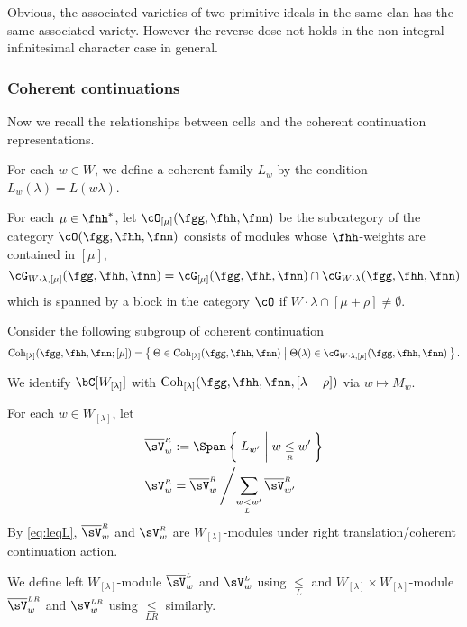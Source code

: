 \documentclass[12pt,a4paper]{amsart}
\numberwithin{equation}{section}
\theoremstyle{remark}
\def\bVL{{\overline{\sV}}^{\scriptscriptstyle L}}
\def\bVR{{\overline{\sV}}^{\scriptscriptstyle R}}
\def\bVLR{{\overline{\sV}}^{\scriptscriptstyle LR}}
\def\VL{{\sV}^{\scriptscriptstyle L}}
\def\VR{{\sV}^{\scriptscriptstyle R}}
\def\VLR{{\sV}^{\scriptscriptstyle LR}}
\def\Coh{\mathrm{Coh}}
\def\lneqL{\mathrel{\mathop{<}\limits_{\scriptscriptstyle L}}}
\def\leqL{\mathrel{\mathop{\leq}\limits_{\scriptscriptstyle L}}}
\def\leqR{\mathrel{\mathop{\leq}\limits_{\scriptscriptstyle R}}}
\def\leqLR{\mathrel{\mathop{\leq}\limits_{\scriptscriptstyle LR}}}
\begin{document}
Obvious, the associated varieties of two primitive ideals in the
same clan has the same associated variety. However the reverse dose not holds in
the non-integral infinitesimal character case in general.

\subsubsection*{Coherent continuations}
Now we recall
the relationships between cells and the coherent continuation
representations.

For each $w\in W$, we define a coherent family $L_{w}$ by the condition
  $L_{w}(\lambda) = L(w\lambda)$.

For each $\mu\in \fhh^{*}$, let
$\cO_{[\mu]}(\fgg,\fhh,\fnn)$ be the subcategory of the category $\cO(\fgg,\fhh,\fnn)$
consists of modules whose $\fhh$-weights are contained in $[\mu]$,
\[
\Grt_{W\cdot\lambda,[\mu]}(\fgg,\fhh,\fnn) = \Grt_{[\mu]}(\fgg,\fhh,\fnn)\cap \Grt_{W\cdot \lambda}(\fgg,\fhh,\fnn)
\]
which is spanned by a block in the category $\cO$ if
$W\cdot \lambda \cap [\mu+\rho]\neq \emptyset$.

Consider the following subgroup of coherent continuation
\[
 \Coh_{[\lambda]}(\fgg,\fhh,\fnn; [\mu]) =
 \Set{\Theta\in \Coh_{[\lambda]}(\fgg,\fhh,\fnn)| \Theta(\lambda) \in
   \Grt_{W\cdot \lambda, [\mu]}(\fgg,\fhh,\fnn)
 }.
\]

We identify $\bC[W_{[\lambda]}]$ with
$\Coh_{[\lambda]}(\fgg,\fhh,\fnn,[\lambda-\rho])$ via $w \mapsto M_{w}$.

For each $w\in W_{[\lambda]}$,
let
\[
  \begin{split}
\bVR_{w}& :=\Span\Set{L_{w'}|w\leqR w'} \\
\VR_{w}&= \bVR _{w}\left/ \sum_{w\lneqL w'} \bVR_{w'} \right.
\end{split}
\]
By \eqref{eq:leqL},
$\bVR_{w}$ and $\VR_{w}$ are $W_{[\lambda]}$-modules under right
translation/coherent continuation action.

We define left $W_{[\lambda]}$-module $\bVL_{w}$ and $\VL_{w}$ using $\leqL$ and
$W_{[\lambda]}\times W_{[\lambda]}$-module $\bVLR_{w}$ and $\VLR_{w}$ using
$\leqLR$ similarly.
\end{document}

